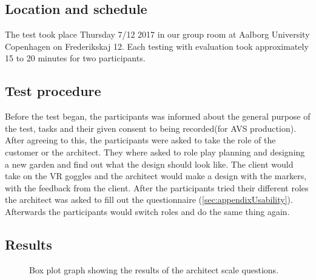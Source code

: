 \subsection*{Location and schedule}
The test took place Thursday 7/12 2017 in our group room at Aalborg University Copenhagen on Frederikskaj 12. Each testing with evaluation took approximately 15 to 20 minutes for two participants.

\subsection*{Test procedure}
Before the test began, the participants was informed about the general purpose of the test, tasks and their given consent to being recorded(for AVS production). After agreeing to this, the participants were asked to take the role of the customer or the architect. They where asked to role play planning and designing a new garden and find out what the design should look like. The client would take on the VR goggles and the architect would make a design with the markers, with the feedback from the client. After the participants tried their different roles the architect was asked to fill out the questionnaire (\ref{sec:appendixUsability}). Afterwards the participants would switch roles and do the same thing again.
\subsection{Results}




\begin{figure}[H]
	\centering
	\caption{Box plot graph showing the results of the architect scale questions.}
	\label{fig:boxPlotResults2}
\end{figure}

